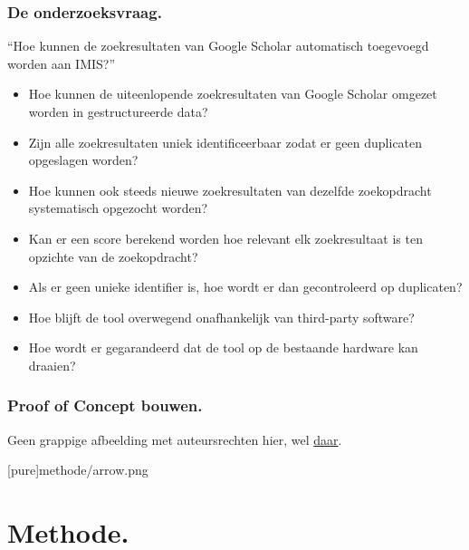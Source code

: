 \documentclass[aspectratio=169]{beamer}
\begin{document}
\begin{frame}
    \frametitle{De onderzoeksvraag.}
    \small
    ``Hoe kunnen de zoekresultaten van Google Scholar automatisch toegevoegd worden aan IMIS?''
    \begin{itemize}
        \item Hoe kunnen de uiteenlopende zoekresultaten van Google Scholar omgezet worden in gestructureerde data?
        \item Zijn alle zoekresultaten uniek identificeerbaar zodat er geen duplicaten opgeslagen worden?
    \end{itemize}
    \begin{itemize}
        \item Hoe kunnen ook steeds nieuwe zoekresultaten van dezelfde zoekopdracht systematisch opgezocht worden?
        \item Kan er een score berekend worden hoe relevant elk zoekresultaat is ten opzichte van de zoekopdracht?
        \item Als er geen unieke identifier is, hoe wordt er dan gecontroleerd op duplicaten? 
    \end{itemize}
    \begin{itemize}
        \item Hoe blijft de tool overwegend onafhankelijk van third-party software?
        \item Hoe wordt er gegarandeerd dat de tool op de bestaande hardware kan draaien? 
    \end{itemize}
    
    
\end{frame}

\begin{frame}
    \frametitle{Proof of Concept bouwen.}
    Geen grappige afbeelding met auteursrechten hier, wel \href{https://www.slideserve.com/zocha/agile-project-management}{daar}.
    
    
    
\end{frame}

{
    [pure]{methode/arrow.png}
\section{Methode.}
}
\end{document}
